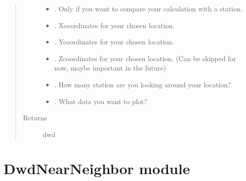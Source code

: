 \documentclass[letterpaper,10pt,english]{sphinxmanual}
\begin{document}
\begin{fulllineitems}
\begin{quote}
\begin{description}
\begin{itemize}
\item {} 
\sphinxAtStartPar
{} \textendash{} . Only if you want to compare your calculation with a station.

\item {} 
\sphinxAtStartPar
{} \textendash{} . X\sphinxhyphen{}coordinates for your chosen location.

\item {} 
\sphinxAtStartPar
{} \textendash{} . Y\sphinxhyphen{}coordinates for your chosen location.

\item {} 
\sphinxAtStartPar
{} \textendash{} . Z\sphinxhyphen{}coordinates for your chosen location. (Can be skipped for now, maybe important in the future)

\item {} 
\sphinxAtStartPar
{} \textendash{} . How many station are you looking around your location?

\item {} 
\sphinxAtStartPar
{} \textendash{} . What data you want to plot?

\end{itemize}

\item[{Returns}] \leavevmode
\sphinxAtStartPar
dwd 

\end{description}\end{quote}

\end{fulllineitems}



\section{DwdNearNeighbor module}
\label{\detokenize{DwdNearNeighbor:module-DwdNearNeighbor}}\label{\detokenize{DwdNearNeighbor:dwdnearneighbor-module}}\label{\detokenize{DwdNearNeighbor::doc}}
\end{document}
